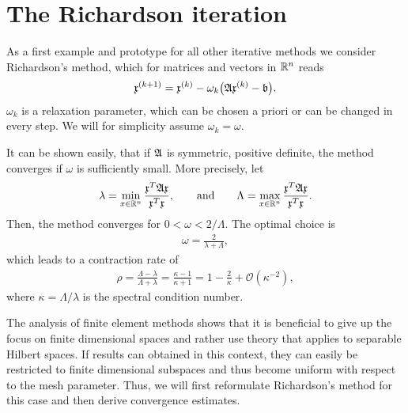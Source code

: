 
\section{The Richardson iteration}

\begin{intro}
  As a first example and prototype for all other iterative methods we
  consider Richardson's method, which for matrices and vectors in
  $\mathbb R^n$ reads
  \begin{gather}
    \label{eq:richardson:1}
    \mathfrak{x}^{(k+1)}
    = \mathfrak{x}^{(k)}
    - \omega_k \bigl(\mathfrak{A} \mathfrak{x}^{(k)} - \mathfrak{b} \bigr).
  \end{gather}
  $\omega_k$ is a relaxation parameter, which can be chosen a priori
  or can be changed in every step. We will for simplicity assume
  $\omega_k = \omega$.
  
  It can be shown easily, that if $\mathfrak{A}$ is symmetric, positive definite,
  the method converges if $\omega$ is sufficiently small. More
  precisely, let
  \begin{gather}
    \label{eq:richardson:3}
    \lambda
    = \min_{x\in \mathbb R^n} \frac{\mathfrak{x}^T\mathfrak{A}\mathfrak{x}}{\mathfrak{x}^T\mathfrak{x}},
    \qquad\text{and}\qquad
    \Lambda = \max_{x\in \mathbb R^n} \frac{\mathfrak{x}^T\mathfrak{A}\mathfrak{x}}{\mathfrak{x}^T\mathfrak{x}}.
  \end{gather}
  Then, the method converges for $0 < \omega < 2/\Lambda$. The optimal
  choice is
  \begin{gather}
    \label{eq:richardson:2}
    \omega = \frac{2}{\lambda+\Lambda},
  \end{gather}
  which leads to a contraction rate of
  \begin{gather}
    \label{eq:richardson:4}
    \rho = \frac{\Lambda-\lambda}{\Lambda+\lambda} =
    \frac{\kappa-1}{\kappa+1} = 1 -\frac2\kappa + \mathcal
    O(\kappa^{-2}),
  \end{gather}
  where $\kappa = \Lambda/\lambda$ is the spectral condition number. 
\end{intro}

\begin{intro}
  The analysis of finite element methods shows that it is beneficial
  to give up the focus on finite dimensional spaces and rather use
  theory that applies to separable Hilbert spaces. If results can
  obtained in this context, they can easily be restricted to finite
  dimensional subspaces and thus become uniform with respect to the
  mesh parameter. Thus, we will first reformulate Richardson's method
  for this case and then derive convergence estimates.
\end{intro}

